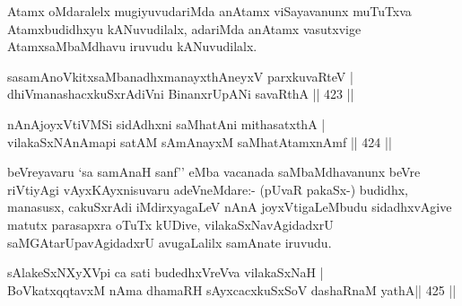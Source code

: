 \begin{artha}
Atamx oMdaralelx mugiyuvudariMda anAtamx viSayavanunx muTuTxva Atamxbudidhxyu kANuvudilalx, adariMda anAtamx vasutxvige AtamxsaMbaMdhavu iruvudu kANuvudilalx.
\end{artha}



\begin{shl}
sasamAnoVkitxsaMbanadhxmanayxthA\s neyxV parxkuvaRteV | \\
\footnotemark[1]dhiVmanashacxkuSxrAdiVni BinanxrUpANi savaRthA \hfill||  423 ||  
\end{shl}

\begin{shl}
nAnAjoyxVtiVMSi sidAdhxni saMhatAni mithasatxthA | \\
vilakaSxNAnAmapi satAM sAmAnayxM saMhatAtamxnAmf \hfill||  424 ||  
\end{shl}

\begin{artha}
beVreyavaru `sa samAnaH sanf'' eMba vacanada saMbaMdhavanunx beVre riVtiyAgi vAyxKAyxnisuvaru adeVneMdare:- (pUvaR pakaSx-) budidhx, manasusx, cakuSxrAdi iMdirxyagaLeV nAnA joyxVtigaLeMbudu sidadhxvAgive matutx parasapxra oTuTx kUDive, vilakaSxNavAgidadxrU saMGAtarUpavAgidadxrU avugaLalilx samAnate iruvudu.
\end{artha}


\begin{shl}
sAlakeSxNXyXV\s pi ca sati budedhxVreVva vilakaSxNaH | \\
BoVkatxqqtavxM nAma dhamaRH sAyxcacxkuSxSoV dashaRnaM yathA\hfill ||  425 ||  
\end{shl}

